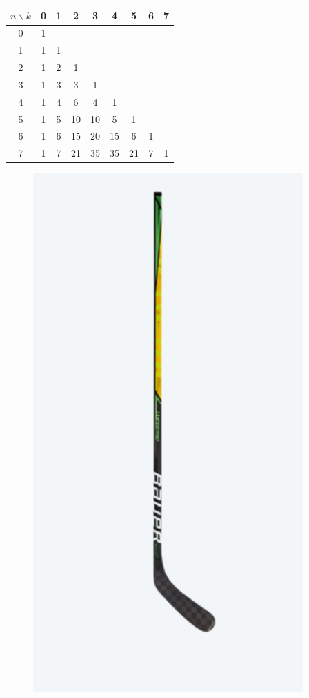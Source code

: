\documentclass[punct]{ctexbeamer}
\begin{document}
\begin{frame}
	\begin{minipage}{0.65\linewidth}
	    \begin{table}[]
	    	\begin{tabular}{c|cccccccc}
	    		$n\backslash k$ & 0 & 1 & 2  & 3  & 4 & 5 & 6 & 7 \\ \hline
	    		0 & 1 &   &    &    &   &   & 	& \\
	    		1 & 1 & 1 &    &    &   &   & 	& \\
	    		2 & 1 & 2 &\cellcolor{green}1  &    &   &   & 	& \\
	    		3 & 1 & 3 & \cellcolor{green}3  & 1  &   &   &	& \\
	    		4 & 1 & 4 & \cellcolor{green}6  & 4  & 1 &   &  & \\
	    		5 & 1 & 5 & \cellcolor{green}10 & 10 & 5 & 1 & & \\
	    		6 & 1 & 6 & \cellcolor{green}15 & 20 & 15 & 6 & 1&  \\
	    		7 & 1 & 7 & 21 & \cellcolor{red}35 & 35 & 21 & 7 & 1\\
	    	\end{tabular}
	    \end{table}
	\end{minipage}
	\begin{minipage}{0.3\linewidth}
	    \begin{figure}
	        \centering
	        \includegraphics[scale=0.3]{HockeyStick.png}

\end{figure}
\end{minipage}
\end{frame}
\end{document}
